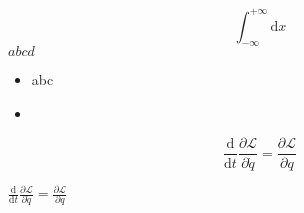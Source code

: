 \documentclass{ctexart}
\begin{document}
\begin{equation}
	\int_{-\infty}^{+\infty}\mathrm{d}x
\end{equation}
$abcd$
\begin{itemize}
	\item abc
	\item
\end{itemize}

\begin{equation}
	\frac{\mathrm{d} }{\mathrm{d} t} \frac{\partial \mathcal{L}}{\partial \dot{q}} = \frac{\partial \mathcal{L}}{\partial q}
\end{equation}

$\frac{\mathrm{d} }{\mathrm{d} t} \frac{\partial \mathcal{L}}{\partial \dot{q}} = \frac{\partial \mathcal{L}}{\partial q}$
\end{document}
